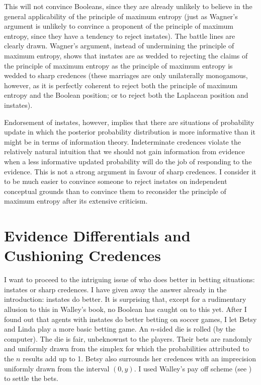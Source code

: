 \documentclass[11pt]{article}
\begin{document}
This will not convince Booleans, since they are already unlikely to
believe in the general applicability of the principle of maximum
entropy (just as Wagner's argument is unlikely to convince a proponent
of the principle of maximum entropy, since they have a tendency to
reject instates). The battle lines are clearly drawn. Wagner's
argument, instead of undermining the principle of maximum entropy,
shows that instates are as wedded to rejecting the claims of the
principle of maximum entropy as the principle of maximum entropy is
wedded to sharp credences (these marriages are only unilaterally
monogamous, however, as it is perfectly coherent to reject both the
principle of maximum entropy and the Boolean position; or to reject
both the Laplacean position and instates).

Endorsement of instates, however, implies that there are situations of
probability update in which the posterior probability distribution is
more informative than it might be in terms of information theory.
Indeterminate credences violate the relatively natural intuition that
we should not gain information from evidence when a less informative
updated probability will do the job of responding to the evidence.
This is not a strong argument in favour of sharp credences. I consider
it to be much easier to convince someone to reject instates on
independent conceptual grounds than to convince them to reconsider the
principle of maximum entropy after its extensive criticism.

\section{Evidence Differentials and Cushioning Credences}
\label{WalleysWorldCupWoes}

I want to proceed to the intriguing issue of who does better in
betting situations: instates or sharp credences. I have given away the
answer already in the introduction: instates do better. It is
surprising that, except for a rudimentary allusion to this in Walley's
book, no Boolean has caught on to this yet. After I found out that
agents with instates do better betting on soccer games, I let Betsy
and Linda play a more basic betting game. An $n$-sided die is rolled
(by the computer). The die is fair, unbeknownst to the players. Their
bets are randomly and uniformly drawn from the simplex for which the
probabilities attributed to the $n$ results add up to 1. Betsy also
surrounds her credences with an imprecision uniformly drawn from the
interval $(0,y)$. I used Walley's pay off scheme (see
) to settle the bets.
\end{document}
